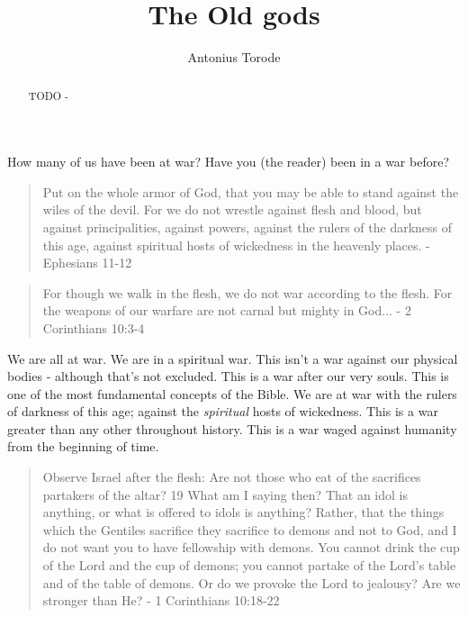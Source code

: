 \documentclass[10pt]{article}
\title{The Old gods}
\author{Antonius Torode}
\begin{document}
\maketitle
\thispagestyle{fancy}


\begin{abstract}
TODO - \lipsum[0-1]
\end{abstract}

\begin{multicols}{2}

How many of us have been at war? Have you (the reader) been in a war before?

\begin{quotation}
Put on the whole armor of God, that you may be able to stand against the wiles of the devil. For we do not wrestle against flesh and blood, but against principalities, against powers, against the rulers of the darkness of this age, against spiritual hosts of wickedness in the heavenly places. - Ephesians 11-12
\end{quotation}

\begin{quotation}
For though we walk in the flesh, we do not war according to the flesh. For the weapons of our warfare are not carnal but mighty in God... - 2 Corinthians 10:3-4
\end{quotation}

We are all at war. We are in a spiritual war. This isn't a war against our physical bodies - although that's not excluded. This is a war after our very souls. This is one of the most fundamental concepts of the Bible. We are at war with the rulers of darkness of this age; against the \textit{spiritual} hosts  of wickedness. This is a war greater than any other throughout history. This is a war waged against humanity from the beginning of time.













\begin{quotation}
Observe Israel after the flesh: Are not those who eat of the sacrifices partakers of the altar? 19 What am I saying then? That an idol is anything, or what is offered to idols is anything? Rather, that the things which the Gentiles sacrifice they sacrifice to demons and not to God, and I do not want you to have fellowship with demons. You cannot drink the cup of the Lord and the cup of demons; you cannot partake of the Lord’s table and of the table of demons. Or do we provoke the Lord to jealousy? Are we stronger than He? - 1 Corinthians 10:18-22
\end{quotation}


\end{multicols}
\end{document}
